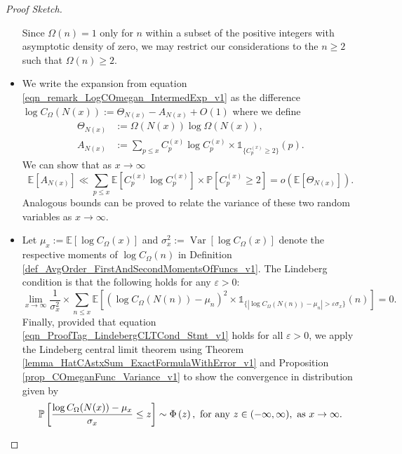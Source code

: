 \documentclass[11pt,reqno,a4letter]{article}
\newcommand{\hlocalref}[1]{\hyperref[#1]{\ref{#1}}}
\numberwithin{equation}{section}
\numberwithin{figure}{section}
\numberwithin{table}{section}
\theoremstyle{plain}
\numberwithin{theorem}{section}
\theoremstyle{definition}
\begin{document}
\begin{proof}[Proof Sketch]
\begin{itemize}[noitemsep,topsep=0pt,leftmargin=0.23in]
Since $\Omega(n) = 1$ only for $n$ within a subset of the positive 
integers with asymptotic density of zero, we may restrict our considerations 
to the $n \geq 2$ such that $\Omega(n) \geq 2$. 
\item 
We write the expansion from equation 
\eqref{eqn_remark_LogCOmegan_IntermedExp_v1} as the difference 
$\log C_{\Omega}(N(x)) := \Theta_{N(x)} - A_{N(x)} + O(1)$ where we define 
\begin{align*}
\Theta_{N(x)} & := \Omega(N(x)) \log \Omega(N(x)), \\ 
A_{N(x)} & := \sum_{p \leq x} C_p^{(x)} \log C_p^{(x)} \times \mathds{1}_{\{C_p^{(x)} \geq 2\}}(p). 
\end{align*}
We can show that as $x \rightarrow \infty$ 
\[
\mathbb{E}[A_{N(x)}] \ll \sum_{p \leq x} \mathbb{E}\left[C_p^{(x)} \log C_p^{(x)}\right] 
     \times \mathbb{P}\left[C_p^{(x)} \geq 2\right] = o\left(\mathbb{E}[\Theta_{N(x)}]\right). 
\]
Analogous bounds can be proved to relate the variance of these 
two random variables as $x \rightarrow \infty$. 
\item 
Let $\mu_x := \mathbb{E}\left[\log C_{\Omega}(x)\right]$ and 
$\sigma_x^2 := \operatorname{Var}\left[\log C_{\Omega}(x)\right]$ denote 
the respective moments of $\log C_{\Omega}(n)$ in 
Definition \hlocalref{def_AvgOrder_FirstAndSecondMomentsOfFuncs_v1}. 
The Lindeberg condition is that the following 
holds for any $\varepsilon > 0$: 
\begin{equation}
\label{eqn_ProofTag_LindebergCLTCond_Stmt_v1}
\lim_{x \rightarrow \infty} \frac{1}{\sigma_x^2} \times 
     \sum_{n \leq x} \mathbb{E}\left[\left(\log C_{\Omega}(N(n)) - \mu_n\right)^2 
     \times 
     \mathds{1}_{\{\left\lvert \log C_{\Omega}(N(n)) - \mu_n \right\rvert > 
     \varepsilon \sigma_x\}}(n)\right] = 0. 
\end{equation}
Finally, provided that 
equation \eqref{eqn_ProofTag_LindebergCLTCond_Stmt_v1} holds for all $\varepsilon > 0$, 
we apply the Lindeberg central limit theorem using 
Theorem \hlocalref{lemma_HatCAstxSum_ExactFormulaWithError_v1} and 
Proposition \hlocalref{prop_COmeganFunc_Variance_v1} to show the 
convergence in distribution given by 
\cite[\S 27]{BILLINGSLY-PROB-AND-MEASURE-BOOK} 
\[
\mathbb{P}\left[\frac{\log C_{\Omega}(N(x)) - \mu_x}{\sigma_x} \leq z\right] \sim 
	\Phi\left(z\right), \text{ for any } z \in (-\infty, \infty), 
	\text{ as } x \rightarrow \infty.
	\qedhere
\]
\end{itemize}
\end{proof}
\end{document}
